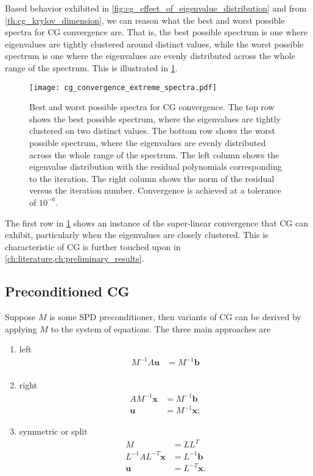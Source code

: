 Based behavior exhibited in \cref{fig:cg_effect_of_eigenvalue_distribution} and from \cref{th:cg_krylov_dimension}, we can reason what the best and worst possible spectra for CG convergence are. That is, the best possible spectrum is one where eigenvalues are tightly clustered around distinct values, while the worst possible spectrum is one where the eigenvalues are evenly distributed across the whole range of the spectrum. This is illustrated in \cref{fig:cg_best_worst_spectra}.
\begin{figure}[H]
  \centering
  \texttt{[image: cg\_convergence\_extreme\_spectra.pdf]}
  \caption{Best and worst possible spectra for CG convergence. The top row shows the best possible spectrum, where the eigenvalues are tightly clustered on two distinct values. The bottom row shows the worst possible spectrum, where the eigenvalues are evenly distributed across the whole range of the spectrum. The left column shows the eigenvalue distribution with the residual polynomials corresponding to the iteration. The right column shows the norm of the residual versus the iteration number. Convergence is achieved at a tolerance of $10^{-6}$.}
  \label{fig:cg_best_worst_spectra}
\end{figure}
The first row in \cref{fig:cg_best_worst_spectra} shows an instance of the super-linear convergence that CG can exhibit, particularly when the eigenvalues are closely clustered. This is characteristic of CG is further touched upon in \cref{ch:literature,ch:preliminary_results}.

\subsection{Preconditioned CG} \label{sec:cg_preconditioning}
Suppose $M$ is some SPD preconditioner, then variants of CG can be derived by applying $M$ to the system of equations. The three main approaches are
\begin{enumerate}[label=\textbf{PCG-\arabic*},ref=\textbf{PCG-type \arabic*},leftmargin=1.25cm]
  \item\label{pcg_type:left} left
  \begin{align*}
    M^{-1}A\mathbf{u} & = M^{-1}\mathbf{b}  \\
  \end{align*}
  \item\label{pcg_type:right} right
  \begin{align*}
    AM^{-1}\mathbf{x} & = M^{-1}\mathbf{b}  \\
    \mathbf{u}        & = M^{-1}\mathbf{x};
  \end{align*}
  \item\label{pcg_type:symmetric} symmetric or split
  \begin{align*}
    M              & = LL^T     \\
    L^{-1}AL^{-T}\mathbf{x} & = L^{-1}\mathbf{b} \\
    \mathbf{u}     & = L^{-T}\mathbf{x}.  \\
  \end{align*}
\end{enumerate}

